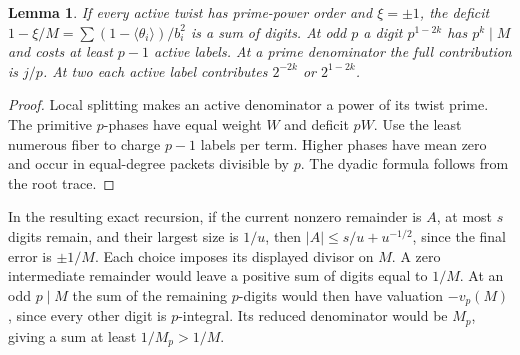 \documentclass[11pt]{amsart}
\numberwithin{equation}{section}
\newtheorem{lemma}[theorem]{Lemma}
\theoremstyle{definition}
\theoremstyle{plain}
\begin{document}
\begin{lemma}
If every active twist has prime-power order and $\xi=\pm1$, the
deficit $1-\xi/M=\sum(1-\langle\theta_i\rangle)/b_i^2$ is a sum of
digits. At odd $p$ a digit $p^{1-2k}$ has $p^k\mid M$ and costs at
least $p-1$ active labels. At a prime denominator the full contribution
is $j/p$. At two each active label contributes $2^{-2k}$ or $2^{1-2k}$.
\end{lemma}
\begin{proof}
Local splitting makes an active denominator a power of its twist prime.
The primitive $p$-phases have equal weight $W$ and deficit $pW$. Use
the least numerous fiber to charge $p-1$ labels per term. Higher
phases have mean zero and occur in equal-degree packets divisible
by $p$. The dyadic formula follows from the root trace.
\end{proof}
In the resulting exact recursion, if the current nonzero remainder
is $A$, at most $s$ digits remain, and their largest size is $1/u$,
then $|A|\le s/u+u^{-1/2}$, since the final error is $\pm1/M$.
Each choice imposes its displayed divisor on $M$. A zero intermediate remainder would leave a positive sum of digits
equal to $1/M$. At an odd $p\mid M$ the sum of the remaining $p$-digits
would then have valuation $-v_p(M)$, since every other digit is
$p$-integral. Its reduced denominator would be $M_p$, giving a sum
at least $1/M_p>1/M$.
\end{document}
